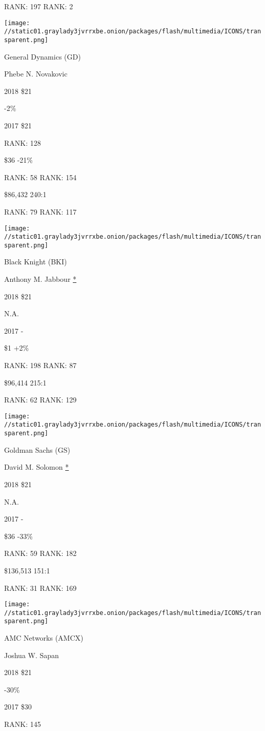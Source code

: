 RANK: 197 RANK: 2

\texttt{[image: //static01.graylady3jvrrxbe.onion/packages/flash/multimedia/ICONS/transparent.png]}

General Dynamics (GD)

Phebe N. Novakovic \protect\hyperlink{g-footnotes}{}

2018 \$21

 -2\%

2017 \$21

RANK: 128

 \$36 -21\%

RANK: 58 RANK: 154

 \$86,432 240:1

RANK: 79 RANK: 117

\texttt{[image: //static01.graylady3jvrrxbe.onion/packages/flash/multimedia/ICONS/transparent.png]}

Black Knight (BKI)

Anthony M. Jabbour \protect\hyperlink{g-footnotes}{*}

2018 \$21

 N.A.

2017 -

 \$1 +2\%

RANK: 198 RANK: 87

 \$96,414 215:1

RANK: 62 RANK: 129

\texttt{[image: //static01.graylady3jvrrxbe.onion/packages/flash/multimedia/ICONS/transparent.png]}

Goldman Sachs (GS)

David M. Solomon \protect\hyperlink{g-footnotes}{*}

2018 \$21

 N.A.

2017 -

 \$36 -33\%

RANK: 59 RANK: 182

 \$136,513 151:1

RANK: 31 RANK: 169

\texttt{[image: //static01.graylady3jvrrxbe.onion/packages/flash/multimedia/ICONS/transparent.png]}

AMC Networks (AMCX)

Joshua W. Sapan \protect\hyperlink{g-footnotes}{}

2018 \$21

 -30\%

2017 \$30

RANK: 145

